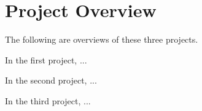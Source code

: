 \section{Project Overview}
The following are overviews of these three projects.

In the first project, ...

In the second project, ...

In the third project, ...